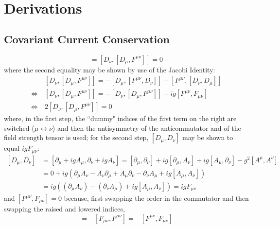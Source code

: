 \chapter{Derivations}
\section{Covariant Current Conservation}
\label{ap:covariant_conservation}
\begin{equation}
	[D_\nu, J^\nu] = [D_\nu, [D_\mu, F^{\mu \nu}]] = 0
\end{equation}
 where the second equality may be shown by use of the Jacobi Identity:
\begin{equation}
\begin{split}
	& [D_\nu, [D_\mu, F^{\mu \nu}]] = - [D_\mu, [F^{\mu \nu}, D_\nu]] - [F^{\mu \nu}, [D_\nu, D_\mu]] \\
	\Leftrightarrow ~ & [D_\nu, [D_\mu, F^{\mu \nu}]] = - [D_\nu, [D_\mu, F^{\mu \nu}]] - ig [F^{\mu \nu}, F_{\mu \nu}]
	\\
	\Leftrightarrow ~ & 2 [D_\nu, [D_\mu, F^{\mu \nu}]] = 0
\end{split}
\end{equation}
where, in the first step, the ``dummy" indices of the first term on the right are switched ($\mu 	\leftrightarrow \nu$) and then the antisymmetry of the anticommutator and of the field strength tensor is used; for the second step, $[D_\mu, D_\nu]$ may be shown to equal $ig F_{\mu \nu}$:
\begin{equation}
\begin{split}
	[D_\mu, D_\nu] & = [\partial_\mu + i g A_\mu, \partial_\nu + i g A_\nu] = [\partial_\mu, \partial_\nu] + ig [\partial_\mu, A_\nu] + i g [A_\mu, \partial_\nu] - g^2 [A^\mu, A^\nu] \\
	& =  0 + ig \left( \partial_\mu A_\nu -  A_\nu \partial_\mu + A_\mu \partial_\nu  - \partial_\nu A_\mu + ig [A_\mu, A_\nu] \right) \\
	& = ig \left( (\partial_\mu A_\nu) - (\partial_\nu A_\mu) + ig [A_\mu, A_\nu] \right) = ig F_{\mu\nu}
\end{split}
\end{equation}
and $[F^{\mu\nu}, F_{\mu\nu}] = 0$ because, first swapping the order in the commutator and then swapping the raised and lowered indices,
\begin{equation}
	[F^{\mu\nu}, F_{\mu\nu}] = -[F_{\mu\nu}, F^{\mu\nu}] = - [F^{\mu\nu}, F_{\mu\nu}]
\end{equation}

